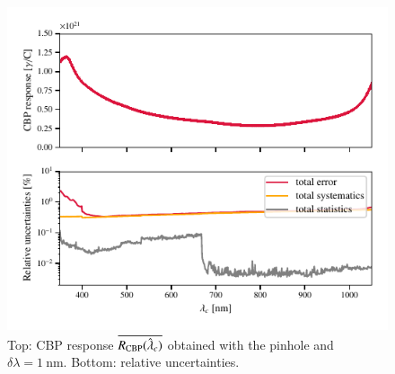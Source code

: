 \begin{figure}[h]
    \centering
    \includegraphics[width=\columnwidth]{fig/cbp_response.pdf}
    \caption{Top: CBP response $\overline{R_{\mathrm{CBP}}(\hat{\lambda}_c)}$ obtained with the \bpinhole{} pinhole and $\delta \lambda = \SI{1}{\nano\meter}$. Bottom: relative uncertainties.}
    \label{fig:cbp_response}
\end{figure}
